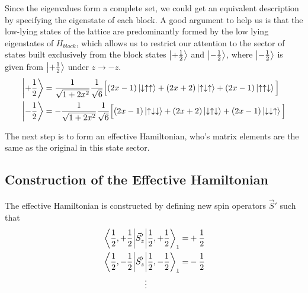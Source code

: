 \documentclass[../rsrg.tex,../../main.tex]{subfiles}
\begin{document}
Since the eigenvalues form a complete set, we could get an equivalent description by specifying the eigenstate of each block. A good argument to help us is that the low-lying states of the lattice are predominantly formed by the low lying eigenstates of $H_{block}$, which allows us to restrict our attention to the sector of states built exclusively from the block states $\ket{+\frac{1}{2}}$ and $\ket{-\frac{1}{2}}$, where $\ket{-\frac{1}{2}}$ is given from $\ket{+\frac{1}{2}}$ under $z\rightarrow-z$.
\begin{equation}
\begin{split}
    \ket{+\frac{1}{2}}&=\frac{1}{\sqrt{1+2x^{2}}}\frac{1}{\sqrt{6}}\Big[(2x-1)\ket{\downarrow\uparrow\uparrow}+(2x+2)\ket{\uparrow\downarrow\uparrow}+(2x-1)\ket{\uparrow\uparrow\downarrow}\Big] \\
    \ket{-\frac{1}{2}}&=-\frac{1}{\sqrt{1+2x^{2}}}\frac{1}{\sqrt{6}}\Big[(2x-1)\ket{\uparrow\downarrow\downarrow}+(2x+2)\ket{\downarrow\uparrow\downarrow}+(2x-1)\ket{\downarrow\downarrow\uparrow}\Big] 
\end{split}
\end{equation}

The next step is to form an effective Hamiltonian, who's matrix elements are the same as the original in this state sector.\\

\subsection{Construction of the Effective Hamiltonian}
The effective Hamiltonian is constructed by defining new spin operators $\vec{S}'$ such that
\begin{equation}
\begin{split}
    \expval{\vec{S}_{z}'}{\frac{1}{2},+\frac{1}{2}}_{1}=&+\frac{1}{2}\\
    \expval{\vec{S}_{z}'}{\frac{1}{2},-\frac{1}{2}}_{1}=&-\frac{1}{2}\\
    \vdots\hspace{50pt}&
\end{split}
\end{equation}
\end{document}
